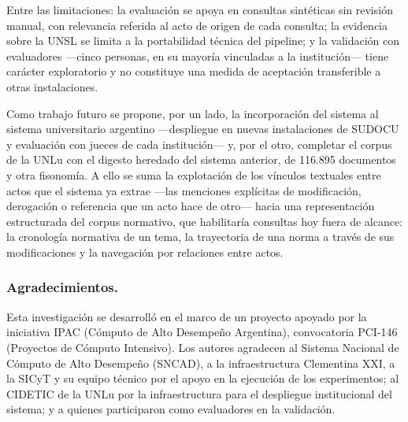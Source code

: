 \documentclass{llncs}
\begin{document}
Entre las limitaciones: la evaluación se apoya en consultas sintéticas sin
revisión manual, con relevancia referida al acto de origen de cada consulta; la
evidencia sobre la UNSL se limita a la portabilidad técnica del pipeline; y la
validación con evaluadores ---cinco personas, en su mayoría vinculadas a la
institución--- tiene carácter exploratorio y no constituye una medida de
aceptación transferible a otras instalaciones.

Como trabajo futuro se propone, por un lado, la incorporación del sistema al
sistema universitario argentino ---despliegue en nuevas instalaciones de SUDOCU
y evaluación con jueces de cada institución--- y, por el otro, completar el
corpus de la UNLu con el digesto heredado del sistema anterior, de
116.895 documentos y otra fisonomía. A ello se suma la explotación de los
vínculos textuales entre actos que el sistema ya extrae ---las menciones
explícitas de modificación, derogación o referencia que un acto hace de
otro--- hacia una representación estructurada del corpus normativo, que
habilitaría consultas hoy fuera de alcance: la cronología normativa de un
tema, la trayectoria de una norma a través de sus modificaciones y la
navegación por relaciones entre actos.


\subsubsection*{Agradecimientos.}
Esta investigación se desarrolló en el marco de un proyecto apoyado por la
iniciativa IPAC (Cómputo de Alto Desempeño Argentina), convocatoria PCI-146
(Proyectos de Cómputo Intensivo). Los autores agradecen al Sistema Nacional de
Cómputo de Alto Desempeño (SNCAD), a la infraestructura Clementina XXI, a la
SICyT y su equipo técnico por el apoyo en la ejecución de los experimentos; al
CIDETIC de la UNLu por la infraestructura para el despliegue institucional del
sistema; y a quienes participaron como evaluadores en la validación.



\end{document}

